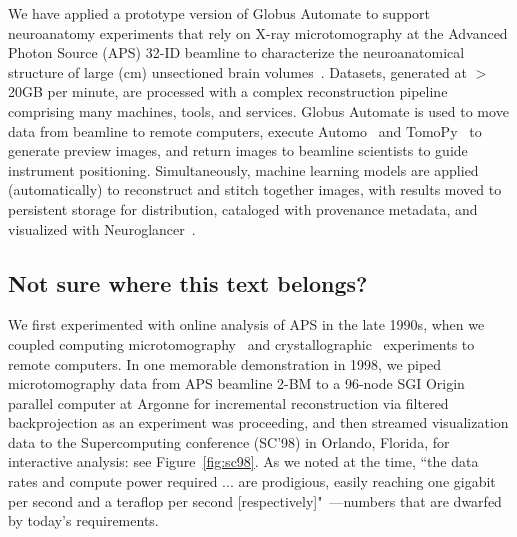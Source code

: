 \documentclass{aip-cp}
\newcommand\kyle[1]{}
\newcommand\kyle[1]{{\color{purple}[Kyle: #1]}}
\begin{document}
We have applied a prototype version of Globus Automate
to support neuroanatomy experiments that rely on
X-ray microtomography at the Advanced Photon Source (APS) 32-ID beamline to
characterize the neuroanatomical structure of large (cm) unsectioned brain volumes~\cite{kasthuri2015saturated}. 
Datasets, generated at $>$20GB per minute, are processed
with a complex reconstruction pipeline 
comprising many machines, tools, and services.  
Globus Automate is used to move data from beamline to remote computers,
execute Automo~\cite{Automo} and TomoPy~\cite{gursoy2014tomopy} 
to generate preview images, and return images to 
beamline scientists to guide instrument positioning. 
Simultaneously, machine learning models
are applied (automatically) to reconstruct and stitch together images, with results 
moved to persistent storage for distribution, cataloged with
provenance metadata, and visualized with Neuroglancer~\cite{Neuroglancer}. 

\kyle{Ryan another APS/ALS flow?}

\subsection{Not sure where this text belongs?}
\kyle{Following text needs to go somewhere}
We first experimented with online analysis of APS in the late 1990s, 
when we coupled 
computing microtomography~\cite{wang1999quasi,wang2001high} and crystallographic~\cite{von2000using}
experiments to remote computers.
In one memorable demonstration in 1998, we piped microtomography data from APS beamline 2-BM to a 96-node SGI Origin parallel computer 
at Argonne for incremental reconstruction via filtered backprojection as an experiment was proceeding,
and then streamed visualization data to the Supercomputing conference (SC'98) in Orlando, Florida, 
for interactive analysis: see Figure~\ref{fig:sc98}. 
As we noted at the time, 
``the data rates and compute power required ... are prodigious, easily reaching one gigabit per second and a teraflop per second [respectively]"~\cite{von2000real}---numbers that are dwarfed by today's requirements. 
\end{document}
